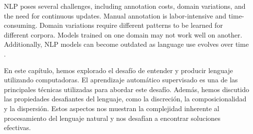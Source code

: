 \documentclass{book}
\begin{document}
NLP poses several challenges, including annotation costs, domain variations, and the need for continuous updates. Manual annotation is labor-intensive and time-consuming. Domain variations require different patterns to be learned for different corpora. Models trained on one domain may not work well on another. Additionally, NLP models can become outdated as language use evolves over time \cite{jacobbook}.








En este capítulo, hemos explorado el desafío de entender y producir lenguaje utilizando computadoras. El aprendizaje automático supervisado es una de las principales técnicas utilizadas para abordar este desafío. Además, hemos discutido las propiedades desafiantes del lenguaje, como la discreción, la composicionalidad y la dispersión. Estos aspectos nos muestran la complejidad inherente al procesamiento del lenguaje natural y nos desafían a encontrar soluciones efectivas.





\end{document}
